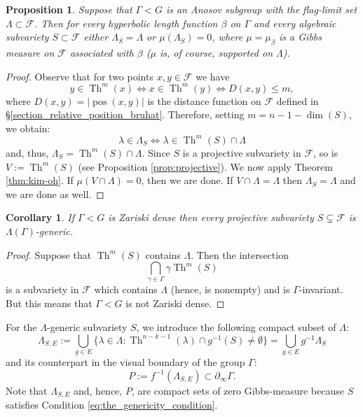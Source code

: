 \documentclass[12pt]{amsbook}%
\newtheorem{prop}[thm]{Proposition}
\newtheorem{cor}[thm]{Corollary}
\theoremstyle{definition}
\theoremstyle{remark}
\newtheorem{rem}[thm]{Remark}
\numberwithin{section}{chapter}
\numberwithin{subsection}{section}
\numberwithin{figure}{chapter}
\DeclareMathOperator{\Th}{Th}
\DeclareMathOperator{\pos}{pos}
\def\cF{{\mathscr{F}}}
\def\Ga{\Gamma}
\def\ga{\gamma}
\def\La{\Lambda}
\def\la{\lambda}
\def\geo{\partial_\infty}
\begin{document}
{{\begin{prop}\label{prop:genericity}
Suppose that $\Ga< G$ is an Anosov subgroup with the flag-limit set $\La\subset \cF$. Then for every hyperbolic length function $\beta$ on $\Ga$ and every 
algebraic subvariety $S\subset \cF$ either $\La_S=\La$ or $\mu(\La_S)=0$, where $\mu=\mu_\beta$ is a Gibbs measure on  $\cF$ associated with $\beta$ ($\mu$ is, of course, supported on $\La$). 
\end{prop}
\begin{proof}  Observe that for two points $x, y\in \cF$ we have
$$
y\in \Th^m(x) \iff x\in \Th^m(y)\iff D(x,y)\le m,
$$
where $D(x,y)=|\pos(x,y)|$ is the distance function on $\cF$ defined in \S \ref{section_relative_position_bruhat}. Therefore, setting $m=n-1-\dim(S)$, we obtain:
$$
\la\in \La_S \iff \la\in \Th^m(S)\cap \La 
$$
and, thus, $\La_S=\Th^m(S)\cap \La$. Since $S$ is a projective subvariety in $\cF$, so is $V:=\Th^m(S)$ (see Proposition \ref{prop:projective}). We now apply Theorem \ref{thm:kim-oh}. If $\mu(V\cap \La)=0$, then we are done. If $V\cap \La=\La$ then $\La_S=\La$ and we are done as well. 
\end{proof}


\begin{cor}\label{cor:all-subvarieties-generic}
If $\Ga< G$ is Zariski dense then every projective subvariety $S\subsetneq \cF$ is $\La(\Ga)$-generic. 
\end{cor}
\begin{proof} Suppose that $\Th^m(S)$ contains $\La$. Then the intersection
$$
\bigcap_{\ga\in \Ga} \ga \Th^m(S)
$$
is a subvariety in $\cF$ which contains $\La$ (hence, is nonempty) and is $\Ga$-invariant. But this means that $\Ga< G$ is not Zariski dense. 
\end{proof}





For the $\Lambda$-generic subvariety $S$, we introduce the following compact subset of $\Lambda$:
$$
\Lambda_{S,E}:=\bigcup_{g\in E}\{\lambda\in \Lambda: \Th^{n-k-1}(\lambda)\cap g^{-1}(S)\ne \emptyset \}= \bigcup_{g\in E} g^{-1}\La_S
$$
and its counterpart in the visual boundary of the group $\Ga$:
\begin{equation}\label{eq:P1} 
P:=f^{-1}(\Lambda_{S,E})\subset \geo \Ga. 
\end{equation}
Note that $\Lambda_{S,E}$ and, hence, $P$, are compact sets of zero Gibbs-measure because $S$ satisfies Condition \eqref{eq:the_genericity_condition}.

}}
\end{document}
